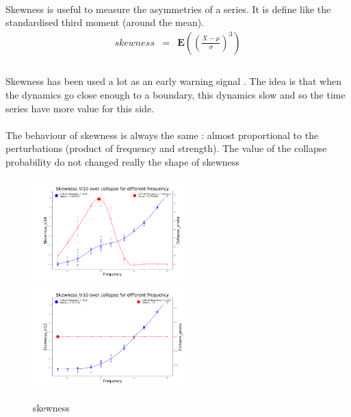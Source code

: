 \documentclass{article}
\begin{document}
\paragraph{}
Skewness is useful to measure the asymmetries of a series. It is define like the standardised third moment (around the mean).
\[
\begin{array}{rcl}
skewness & = & \mathbf{E}((\frac{X-\mu}{\sigma})^3) \\
\end{array}
\]

\paragraph{}
Skewness has been used a lot as an early warning signal \citep{biggs_turning_2009, guttal_changing_2008, dakos_flickering_2013, brock_interacting_2010, takimoto_early_2009, fung_warning_2013, guttal_spatial_2009}. The idea is that when the dynamics go close enough to a boundary, this dynamics slow \citep{scheffer2009early} and so the time series 
have more value for this side.


\paragraph{} %
The behaviour of skewness is always the same : almost proportional to the perturbations (product of frequency and strength). The value of the collapse probability do not changed really the shape of skewness

\begin{figure}[h!]
\centering
\includegraphics[width=6cm]{skewness1b.png}
\includegraphics[width=6cm]{skewness2b.png}
\caption{skewness}
\end{figure}
\end{document}

